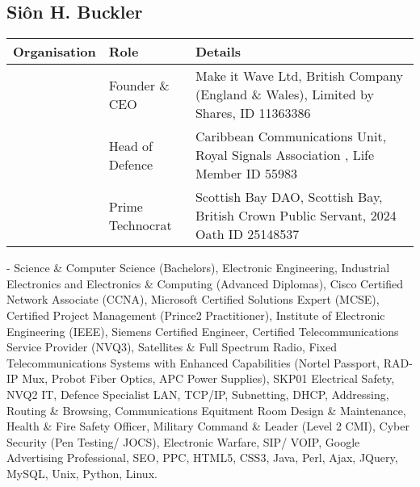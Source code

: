 \documentclass[letterpaper,10pt,english]{sphinxmanual}
\begin{document}
\subsection{Siôn H. Buckler}
\label{\detokenize{index:sion-h-buckler}}

\begin{savenotes}\sphinxattablestart
\centering
\begin{tabulary}{\linewidth}[t]{|T|T|T|}
\hline
\sphinxstyletheadfamily 
Organisation
&\sphinxstyletheadfamily 
Role
&\sphinxstyletheadfamily 
Details
\\
\hline
\noindent{}
&
Founder \& CEO
&
Make it Wave Ltd, British Company (England \& Wales), Limited by Shares, ID 11363386
\\
\hline
\noindent{}
&
Head of Defence
&
Caribbean Communications Unit, Royal Signals Association , Life Member ID 55983
\\
\hline
\noindent{}
&
Prime Technocrat
&
Scottish Bay DAO, Scottish Bay, British Crown Public Servant, 2024 Oath ID 25148537
\\
\hline
\end{tabulary}
\par
\sphinxattableend\end{savenotes}

 - Science \& Computer Science (Bachelors), Electronic Engineering, Industrial Electronics and Electronics \& Computing (Advanced Diplomas), Cisco Certified Network Associate (CCNA), Microsoft Certified Solutions Expert (MCSE), Certified Project Management (Prince2 Practitioner), Institute of Electronic Engineering (IEEE), Siemens Certified Engineer, Certified Telecommunications Service Provider (NVQ3), Satellites \& Full Spectrum Radio, Fixed Telecommunications Systems with Enhanced Capabilities (Nortel Passport, RAD-IP Mux, Probot Fiber Optics, APC Power Supplies), SKP01 Electrical Safety, NVQ2 IT, Defence Specialist LAN, TCP/IP, Subnetting, DHCP, Addressing, Routing \& Browsing, Communications Equitment Room Design \& Maintenance, Health \& Fire Safety Officer, Military Command \& Leader (Level 2 CMI),  Cyber Security (Pen Testing/ JOCS), Electronic Warfare, SIP/ VOIP, Google Advertising Professional, SEO, PPC, HTML5, CSS3, Java, Perl, Ajax, JQuery, MySQL, Unix, Python, Linux.



\renewcommand{\indexname}{Index}
\printindex
\end{document}
